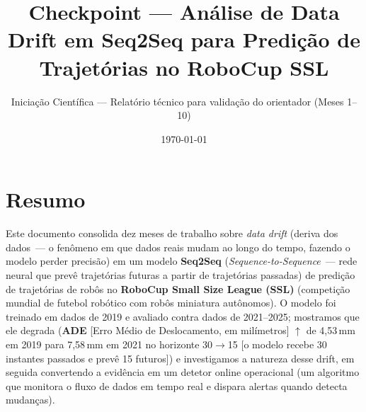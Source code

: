 \documentclass[11pt,a4paper]{article}
\title{\vspace{-1.5cm}Checkpoint --- An\'alise de Data Drift em Seq2Seq para
       Predi\c{c}\~ao de Trajet\'orias no RoboCup SSL}
\author{Inicia\c{c}\~ao Cient\'ifica --- Relat\'orio t\'ecnico para valida\c{c}\~ao
        do orientador (Meses 1--10)}
\date{\today}
\begin{document}
\maketitle
\vspace{-0.6cm}

\section*{Resumo}

Este documento consolida dez meses de trabalho sobre \emph{data drift} (deriva dos dados~--- o fen\^omeno em que dados reais mudam ao longo do tempo, fazendo o modelo perder precis\~ao) em um modelo \textbf{Seq2Seq} (\emph{Sequence-to-Sequence}~--- rede neural que prev\^e trajet\'orias futuras a partir de trajet\'orias passadas) de predi\c{c}\~ao de trajet\'orias de rob\^os no \textbf{RoboCup Small Size League (SSL)} (competi\c{c}\~ao mundial de futebol rob\'otico com rob\^os min\-i\-a\-tu\-ra aut\^onomos). O modelo foi treinado em dados de 2019 e avaliado contra dados de 2021--2025; mostramos que ele degrada (\textbf{ADE} [Erro M\'edio de Deslocamento, em mil\'imetros] $\uparrow$ de 4{,}53\,mm em 2019 para 7{,}58\,mm em 2021 no horizonte 30$\to$15 [o modelo recebe 30 instantes passados e prev\^e 15 futuros]) e investigamos a natureza desse drift, em seguida convertendo a evid\^encia em um detetor online operacional (um algoritmo que monitora o fluxo de dados em tempo real e dispara alertas quando detecta mudan\c{c}as).
\end{document}
